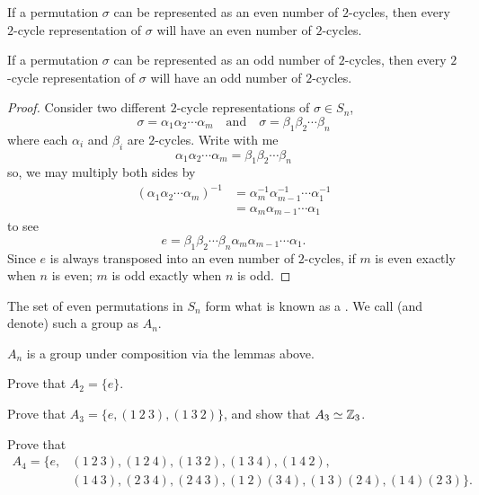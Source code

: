 \documentclass{ximera}
\begin{document}
\begin{lemma}
  If a permutation $\sigma$ can be represented as an even number of
  $2$-cycles, then every $2$-cycle representation of $\sigma$ will
  have an even number of $2$-cycles.

  If a permutation $\sigma$ can be represented as an odd number of
  $2$-cycles, then every $2$-cycle representation of $\sigma$ will
  have an odd number of $2$-cycles.
  \begin{proof}
    Consider two different $2$-cycle representations of $\sigma\in S_n$,
    \[
    \sigma = \alpha_1\alpha_2\cdots\alpha_m \quad\text{and}\quad \sigma = \beta_1\beta_2\cdots\beta_n 
    \]
    where each $\alpha_i$ and $\beta_i$ are $2$-cycles. Write with me
    \[
    \alpha_1\alpha_2\cdots\alpha_m = \beta_1\beta_2\cdots\beta_n
    \]
    so, we may multiply both sides by
    \begin{align*}
    (\alpha_1\alpha_2\cdots\alpha_m)^{-1} &= \alpha_m^{-1}\alpha_{m-1}^{-1}\cdots\alpha_1^{-1}\\
    &= \alpha_m\alpha_{m-1}\cdots\alpha_1
    \end{align*}
    to see
    \[
    e = \beta_1\beta_2\cdots\beta_n\alpha_m\alpha_{m-1}\cdots\alpha_1.
    \]
    Since $e$ is always transposed into an even number of $2$-cycles,
    if $m$ is even exactly when $n$ is even; $m$ is odd exactly when
    $n$ is odd.
  \end{proof}
\end{lemma}






\begin{definition}
  The set of even permutations in $S_n$ form what is known as a
  . We call (and denote) such a group as $A_n$.
\end{definition}

\begin{remark}
  $A_n$ is a group under composition via the lemmas above.
\end{remark}

\begin{exercise}
  Prove that $A_2 = \{e\}$.
\end{exercise}

\begin{exercise}
  Prove that $A_3 = \{e,(1\ 2\ 3), (1\ 3\ 2)\}$, and show that
  $A_3\simeq \mathbb Z_3$.
\end{exercise}

\begin{exercise}
  Prove that
  \begin{align*}
    A_4 =\{e, &(1\ 2\ 3), (1\ 2\ 4), (1\ 3 \ 2), (1\ 3\ 4),  (1\ 4\ 2),  \\
    &(1\ 4\ 3),(2 \ 3 \ 4), (2 \ 4 \ 3), (1\ 2)(3 \ 4), (1\ 3)(2\ 4),(1\ 4)(2\ 3)\}.
  \end{align*}
\end{exercise}
\end{document}
